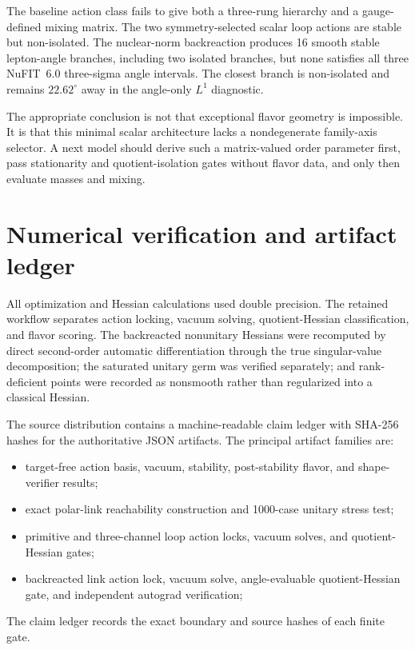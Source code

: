 \documentclass[11pt]{article}
\begin{document}
The baseline action class fails to give both a three-rung hierarchy and a gauge-defined mixing matrix.  The two symmetry-selected scalar loop actions are stable but non-isolated.  The nuclear-norm backreaction produces 16 smooth stable lepton-angle branches, including two isolated branches, but none satisfies all three NuFIT~6.0 three-sigma angle intervals.  The closest branch is non-isolated and remains $22.62^\circ$ away in the angle-only $L^1$ diagnostic.

The appropriate conclusion is not that exceptional flavor geometry is impossible.  It is that this minimal scalar architecture lacks a nondegenerate family-axis selector.  A next model should derive such a matrix-valued order parameter first, pass stationarity and quotient-isolation gates without flavor data, and only then evaluate masses and mixing.

\appendix
\section{Numerical verification and artifact ledger}
\label{app:repro}

All optimization and Hessian calculations used double precision.  The retained workflow separates action locking, vacuum solving, quotient-Hessian classification, and flavor scoring.  The backreacted nonunitary Hessians were recomputed by direct second-order automatic differentiation through the true singular-value decomposition; the saturated unitary germ was verified separately; and rank-deficient points were recorded as nonsmooth rather than regularized into a classical Hessian.

The source distribution contains a machine-readable claim ledger with SHA-256 hashes for the authoritative JSON artifacts.  The principal artifact families are:
\begin{itemize}[leftmargin=2.1em]
  \item target-free action basis, vacuum, stability, post-stability flavor, and shape-verifier results;
  \item exact polar-link reachability construction and 1000-case unitary stress test;
  \item primitive and three-channel loop action locks, vacuum solves, and quotient-Hessian gates;
  \item backreacted link action lock, vacuum solve, angle-evaluable quotient-Hessian gate, and independent autograd verification;
\end{itemize}
The claim ledger records the exact boundary and source hashes of each finite gate.



\end{document}
